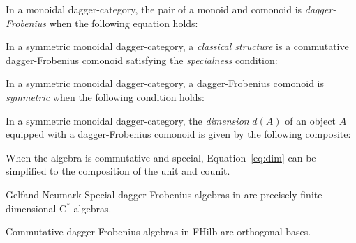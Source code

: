 \begin{defn}
In a monoidal dagger-category, the pair of a monoid  and comonoid  is \emph{dagger-Frobenius} when the following equation holds:
\begin{equation}
\label{eq:frobenius}

\end{equation}
\end{defn}

\begin{defn}
In a symmetric monoidal dagger-category, a \textit{classical structure} is a commutative dagger-Frobenius comonoid  satisfying the \textit{specialness} condition:
\begin{equation}

\end{equation}
\end{defn}


\begin{defn}
In a symmetric monoidal dagger-category, a dagger-Frobenius comonoid is \emph{symmetric} when the following condition holds:
\begin{equation}

\end{equation}
\end{defn}

\begin{defn}
In a symmetric monoidal dagger-category, the \emph{dimension} $d(A)$ of an object $A$ equipped with a dagger-Frobenius comonoid  is given by the following composite:
\begin{equation}
\label{eq:dim}

\end{equation}
\end{defn}
\noindent
When the algebra is commutative and special, Equation~\eqref{eq:dim} can be simplified to the composition of the unit and counit.

\begin{defn}
\end{defn}

\begin{theorem}{Gelfand-Neumark}
Special dagger Frobenius algebras in  are precisely finite-dimensional C$^*$-algebras.
\end{theorem}

\begin{theorem}{\cite[Thm 5.1]{coecke2013new}}
Commutative dagger Frobenius algebras in FHilb are orthogonal bases.
\end{theorem}

